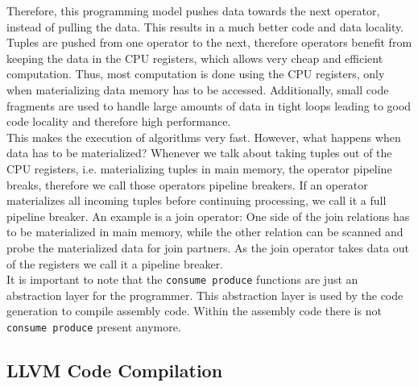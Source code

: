 Therefore, this programming model pushes data towards the next operator, instead of pulling the data. This results in a much better code and data locality. Tuples are pushed from one operator to the next, therefore operators benefit from keeping the data in the CPU registers, which allows very cheap and efficient computation. Thus, most computation is done using the CPU registers, only when materializing data memory has to be accessed. Additionally, small code fragments are used to handle large amounts of data in tight loops leading to good code locality and therefore high performance.
\\
This makes the execution of algorithms very fast. However, what happens when data has to be materialized? Whenever we talk about taking tuples out of the CPU registers, i.e. materializing tuples in main memory, the operator pipeline breaks, therefore we call those operators pipeline breakers. If an operator materializes all incoming tuples before continuing processing, we call it a full pipeline breaker. An example is a join operator: One side of the join relations has to be materialized in main memory,  while the other relation can be scanned and probe the materialized data for join partners. As the join operator takes data out of the registers we call it a pipeline breaker.
\\
It is important to note that the \texttt{consume produce} functions are just an abstraction layer for the programmer. This abstraction layer is used by the code generation to compile assembly code. Within the assembly code there is not \texttt{consume produce} present anymore.

\subsection{LLVM Code Compilation}

